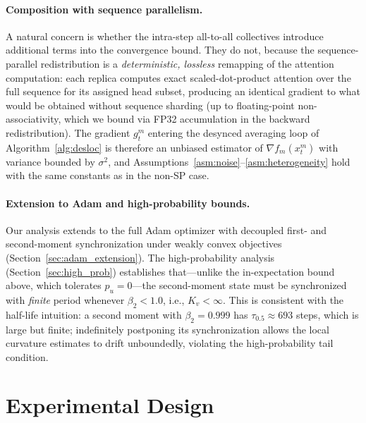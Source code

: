 \documentclass{article}
\begin{document}
\paragraph{Composition with sequence parallelism.}
A natural concern is whether the intra-step all-to-all collectives
introduce additional terms into the convergence bound. They do not,
because the sequence-parallel redistribution is a \emph{deterministic,
lossless} remapping of the attention computation: each replica
computes exact scaled-dot-product attention over the full sequence
for its assigned head subset, producing an identical gradient to what
would be obtained without sequence sharding (up to floating-point
non-associativity, which we bound via FP32 accumulation in the
backward redistribution). The gradient $g_t^m$ entering the
desynced averaging loop of Algorithm~\ref{alg:desloc} is therefore
an unbiased estimator of $\nabla f_m(x_t^m)$ with variance bounded
by $\sigma^2$, and Assumptions~\ref{asm:noise}--\ref{asm:heterogeneity}
hold with the same constants as in the non-SP case.

\paragraph{Extension to Adam and high-probability bounds.}
Our analysis extends to the full Adam optimizer with decoupled first-
and second-moment synchronization under weakly convex objectives
(Section~\ref{sec:adam_extension}). The high-probability analysis
(Section~\ref{sec:high_prob}) establishes that---unlike the in-expectation
bound above, which tolerates $p_u = 0$---the second-moment state must be
synchronized with \emph{finite} period whenever $\beta_2 < 1.0$, i.e.,
$K_v < \infty$. This is consistent with the half-life
intuition: a second moment with $\beta_2 = 0.999$ has
$\tau_{0.5} \approx 693$ steps, which is large but finite; indefinitely
postponing its synchronization allows the local curvature estimates
to drift unboundedly, violating the high-probability tail condition.

\section{Experimental Design}
\label{sec:experimental_design}
\end{document}

